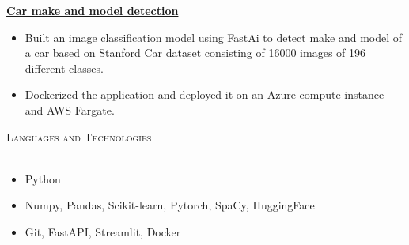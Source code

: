 \documentclass[a4paper]{article}
\newcommand{\lineunder} {
    \vspace*{-8pt} \\
    \hspace*{-18pt} \hrulefill \\
}
\newcommand{\header} [1] {
    {\hspace*{-18pt}\vspace*{6pt} \textsc{#1}}
    \vspace*{-6pt} \lineunder
}
\begin{document}
\href{https://github.com/aakashb95/car-detection}{\textbf{Car make and model detection}}
\begin{itemize} \itemsep 1pt
    \item Built an image classification model using FastAi to detect make and model of a car based on Stanford Car dataset consisting of 16000 images of 196 different classes.
    \item Dockerized the application and deployed it on an Azure compute instance and AWS Fargate.
\end{itemize}
\vspace*{2mm}


\header{Languages and Technologies}
\begin{itemize}
    \item Python
    \item Numpy, Pandas, Scikit-learn, Pytorch, SpaCy, HuggingFace
    \item Git, FastAPI, Streamlit, Docker
\end{itemize}

\vspace{2mm}

\
\end{document}
